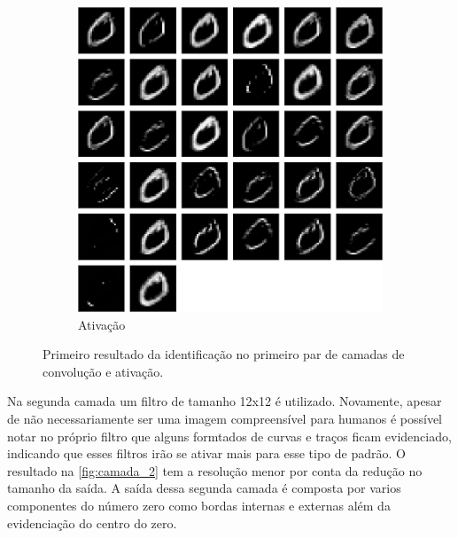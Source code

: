 \documentclass[
	12pt,				%
	oneside,			%
	a4paper,			%
	english,			%
	french,				%
	spanish,			%
	brazil,				%
	]{abntex2}
\begin{document}
\begin{center}
\begin{figure}[H]
\begin{subfigure}{.8\textwidth}
\centering
\includegraphics[width=.6\linewidth]{images/fabio/resultados/network_3/input_1_layer_activation_1}%
\caption{Ativação}			
\end{subfigure}%
\caption{Primeiro resultado da identificação no primeiro par de camadas de convolução e ativação.}
\label{fig:camada_1}
\end{figure}
\end{center}


\par Na segunda camada um filtro de tamanho 12x12 é utilizado. Novamente, apesar de não necessariamente ser uma imagem compreensível para humanos é possível notar no próprio filtro que alguns formtados de curvas e traços ficam evidenciado, indicando que esses filtros irão se ativar mais para esse tipo de padrão. O resultado na \autoref{fig:camada_2} tem a resolução menor por conta da redução no tamanho da saída. A saída dessa segunda camada é composta por varios componentes do número zero como bordas internas e externas além da evidenciação do centro do zero.
\end{document}
